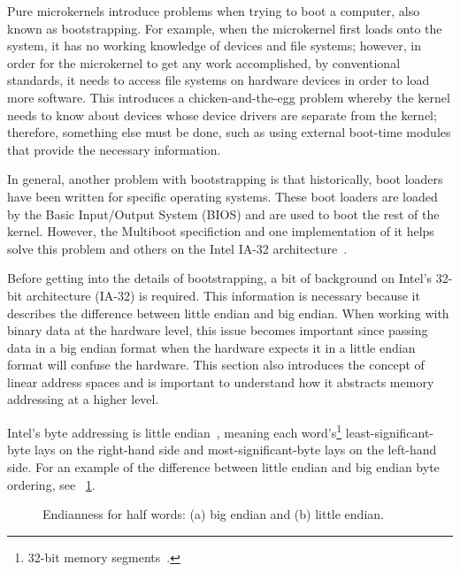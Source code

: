 
Pure microkernels introduce problems when trying to boot a computer, also known
as {\important bootstrapping}.  For example, when the microkernel first
loads onto the system, it has no working knowledge of devices and file
systems; however, in order for the microkernel to get any
work accomplished, by conventional standards, it needs to
access file systems on hardware devices in order to load more software.  This
introduces a chicken-and-the-egg problem
whereby the kernel needs to know about devices whose device drivers are
separate from the kernel; therefore, something else must
be done, such as using external boot-time modules that provide the
necessary information.

In general, another problem with bootstrapping is that historically, boot
loaders have been written for specific operating systems.  These
boot loaders are loaded by the Basic Input/Output System (BIOS) and
are used to boot the rest of the kernel.  However, the
Multiboot specifiction and one implementation of it helps solve this
problem and others on the Intel IA-32 architecture~\cite{grub_info}.


Before getting into the details of bootstrapping, a bit of background on
Intel's 32-bit architecture (IA-32) is required.  This information is
necessary because it describes the difference between little endian
and big endian.  When working with binary data at the hardware level,
this issue becomes important since passing data in a big endian format
when the hardware expects it in a little endian format will confuse the
hardware.  This section also introduces the concept of linear address
spaces and is important to understand how it abstracts memory addressing
at a higher level.

Intel's byte addressing is {\important little endian}~\cite{ia32-1-2004},
meaning each
{\important word}'s\footnote{32-bit memory segments~\cite{hennessy2003}.}
least-significant-byte lays on the right-hand side
and most-significant-byte lays on the left-hand side.
For an example of the difference between little endian and big endian
byte ordering, see \figurename~\ref{fig:endianness}.

	\begin{figure}[tb]
	\begin{center}
	\end{center}
	\caption{Endianness for half words: (a) big endian and (b) little
		endian.}%
	\label{fig:endianness}
	\end{figure}

